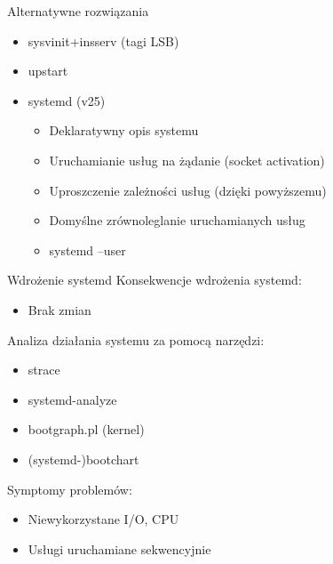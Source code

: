 \documentclass[presentation,aspectratio=43,12pt]{beamer}
\begin{document}
\begin{frame}[label=sec-4-3]{Alternatywne rozwiązania}
\begin{itemize}
\item sysvinit+insserv (tagi LSB)
\item upstart
\item systemd (v25)
\begin{itemize}
\item <2-> Deklaratywny opis systemu
\item <2-> Uruchamianie usług na żądanie (socket activation)
\item <2-> Uproszczenie zależności usług (dzięki powyższemu)
\item <2-> Domyślne zrównoleglanie uruchamianych usług
\item <2-> systemd --user
\end{itemize}
\end{itemize}

\end{frame}
\begin{frame}[label=sec-4-4]{Wdrożenie systemd}
Konsekwencje wdrożenia systemd:

\pause

\begin{itemize}
\item Brak zmian
\end{itemize}

\pause

Analiza działania systemu za pomocą narzędzi:
\begin{itemize}
\item strace
\item systemd-analyze
\item bootgraph.pl (kernel)
\item (systemd-)bootchart
\end{itemize}

\pause
Symptomy problemów:
\begin{itemize}
\item Niewykorzystane I/O, CPU
\item Usługi uruchamiane sekwencyjnie
\end{itemize}


\end{frame}
\end{document}
